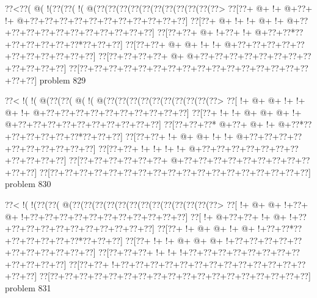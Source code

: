 \vbox{\vbox{\goo
\0??<\0??(\- @(\- !(\0??(\0??(\- !(\- @(\0??(\0??(\0??(\0??(\0??(\0??(\0??(\0??(\0??(\0??(\0??>
\0??[\0??+\- @+\- !+\- @+\0??+\- !+\- @+\0??+\0??+\0??+\0??+\0??+\0??+\0??+\0??+\0??+\0??+\0??]
\0??[\0??+\- @+\- !+\- !+\- @+\- !+\- @+\0??+\0??+\0??+\0??+\0??+\0??+\0??+\0??+\0??+\0??+\0??]
\0??[\0??+\0??+\- @+\- !+\0??+\- !+\- @+\0??+\0??*\0??+\0??+\0??+\0??+\0??+\0??*\0??+\0??+\0??]
\0??[\0??+\0??+\- @+\- @+\- !+\- !+\- @+\0??+\0??+\0??+\0??+\0??+\0??+\0??+\0??+\0??+\0??+\0??]
\0??[\0??+\0??+\0??+\0??+\- @+\- @+\0??+\0??+\0??+\0??+\0??+\0??+\0??+\0??+\0??+\0??+\0??+\0??]
\0??[\0??+\0??+\0??+\0??+\0??+\0??+\0??+\0??+\0??+\0??+\0??+\0??+\0??+\0??+\0??+\0??+\0??+\0??]
}
\hfil problem 829\hfil\break
}



\vbox{\vbox{\goo
\0??<\- !(\- !(\- @(\0??(\0??(\- @(\- !(\- @(\0??(\0??(\0??(\0??(\0??(\0??(\0??(\0??(\0??(\0??>
\0??[\- !+\- @+\- @+\- !+\- !+\- @+\- !+\- @+\0??+\0??+\0??+\0??+\0??+\0??+\0??+\0??+\0??+\0??]
\0??[\0??+\- !+\- !+\- @+\- @+\- @+\- !+\- @+\0??+\0??+\0??+\0??+\0??+\0??+\0??+\0??+\0??+\0??]
\0??[\0??+\0??+\0??*\- @+\0??+\- @+\- !+\- @+\0??*\0??+\0??+\0??+\0??+\0??+\0??*\0??+\0??+\0??]
\0??[\0??+\0??+\- !+\- @+\- @+\- !+\- !+\- @+\0??+\0??+\0??+\0??+\0??+\0??+\0??+\0??+\0??+\0??]
\0??[\0??+\0??+\- !+\- !+\- !+\- !+\- @+\0??+\0??+\0??+\0??+\0??+\0??+\0??+\0??+\0??+\0??+\0??]
\0??[\0??+\0??+\0??+\0??+\0??+\0??+\- @+\0??+\0??+\0??+\0??+\0??+\0??+\0??+\0??+\0??+\0??+\0??]
\0??[\0??+\0??+\0??+\0??+\0??+\0??+\0??+\0??+\0??+\0??+\0??+\0??+\0??+\0??+\0??+\0??+\0??+\0??]
}
\hfil problem 830\hfil\break
}



\vbox{\vbox{\goo
\0??<\- !(\- !(\0??(\0??(\- @(\0??(\0??(\0??(\0??(\0??(\0??(\0??(\0??(\0??(\0??(\0??(\0??(\0??>
\0??[\- !+\- @+\- @+\- !+\0??+\- @+\- !+\0??+\0??+\0??+\0??+\0??+\0??+\0??+\0??+\0??+\0??+\0??]
\0??[\- !+\- @+\0??+\0??+\- !+\- @+\- !+\0??+\0??+\0??+\0??+\0??+\0??+\0??+\0??+\0??+\0??+\0??]
\0??[\0??+\- !+\- @+\- @+\- !+\- @+\- !+\0??+\0??*\0??+\0??+\0??+\0??+\0??+\0??*\0??+\0??+\0??]
\0??[\0??+\- !+\- !+\- @+\- @+\- @+\- !+\0??+\0??+\0??+\0??+\0??+\0??+\0??+\0??+\0??+\0??+\0??]
\0??[\0??+\0??+\0??+\- !+\- !+\- !+\0??+\0??+\0??+\0??+\0??+\0??+\0??+\0??+\0??+\0??+\0??+\0??]
\0??[\0??+\0??+\- !+\0??+\0??+\0??+\0??+\0??+\0??+\0??+\0??+\0??+\0??+\0??+\0??+\0??+\0??+\0??]
\0??[\0??+\0??+\0??+\0??+\0??+\0??+\0??+\0??+\0??+\0??+\0??+\0??+\0??+\0??+\0??+\0??+\0??+\0??]
}
\hfil problem 831\hfil\break
}



